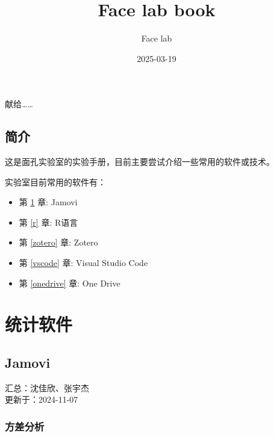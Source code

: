 \documentclass[]{ctexbook}
\title{Face lab book}
\author{Face lab}
\date{2025-03-19}
\providecommand{\tightlist}{%
  \setlength{\itemsep}{0pt}\setlength{\parskip}{0pt}}
\theoremstyle{definition}
\theoremstyle{definition}
\theoremstyle{definition}
\theoremstyle{definition}
\theoremstyle{remark}
\begin{document}
\maketitle


\thispagestyle{empty}

\begin{center}
献给……

\end{center}

\setlength{\abovedisplayskip}{-5pt}
\setlength{\abovedisplayshortskip}{-5pt}

{
\setcounter{tocdepth}{2}
\tableofcontents
}
\listoftables
\listoffigures
\chapter{简介}\label{ux7b80ux4ecb}

这是面孔实验室的实验手册，目前主要尝试介绍一些常用的软件或技术。

实验室目前常用的软件有：

\begin{itemize}
\tightlist
\item
  第 \ref{jamovi} 章: Jamovi\\
\item
  第 \ref{r} 章: R语言\\
\item
  第 \ref{zotero} 章: Zotero
\item
  第 \ref{vscode} 章: Visual Studio Code\\
\item
  第 \ref{onedrive} 章: One Drive
\end{itemize}

\mainmatter

\part{统计软件}\label{part-ux7edfux8ba1ux8f6fux4ef6}

\chapter{Jamovi}\label{jamovi}

汇总：沈佳欣、张宇杰\\
更新于：2024-11-07

\section{方差分析}\label{ux65b9ux5deeux5206ux6790}
\end{document}
